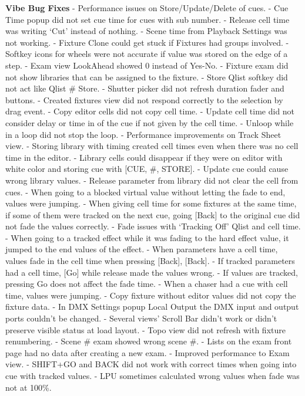 \documentclass[
]{article}
\begin{document}
\textbf{Vibe Bug Fixes}
- Performance issues on Store/Update/Delete of cues.
- Cue Time popup did not set cue time for cues with sub number.
- Release cell time was writing `Cut' instead of nothing.
- Scene time from Playback Settings was not working.
- Fixture Clone could get stuck if Fixtures had groups involved.
- Softkey icons for wheels were not accurate if value was stored on the edge of a step.
- Exam view LookAhead showed 0 instead of Yes-No.
- Fixture exam did not show libraries that can be assigned to the fixture.
- Store Qlist softkey did not act like Qlist \# Store.
- Shutter picker did not refresh duration fader and buttons.
- Created fixtures view did not respond correctly to the selection by drag event.
- Copy editor cells did not copy cell time.
- Update cell time did not consider delay or time in of the cue if not given by the cell time.
- Unloop while in a loop did not stop the loop.
- Performance improvements on Track Sheet view.
- Storing library with timing created cell times even when there was no cell time in the editor.
- Library cells could disappear if they were on editor with white color and storing cue with {[}CUE, \#, STORE{]}.
- Update cue could cause wrong library values.
- Release parameter from library did not clear the cell from cues.
- When going to a blocked virtual value without letting the fade to end, values were jumping.
- When giving cell time for some fixtures at the same time, if some of them were tracked on the next cue, going {[}Back{]} to the original cue did not fade the values correctly.
- Fade issues with `Tracking Off' Qlist and cell time.
- When going to a tracked effect while it was fading to the hard effect value, it jumped to the end values of the effect.
- When parameters have a cell time, values fade in the cell time when pressing {[}Back{]}, {[}Back{]}.
- If tracked parameters had a cell time, {[}Go{]} while release made the values wrong.
- If values are tracked, pressing Go does not affect the fade time.
- When a chaser had a cue with cell time, values were jumping.
- Copy fixture without editor values did not copy the fixture data.
- In DMX Settings popup Local Output the DMX input and output ports couldn't be changed.
- Several views' Scroll Bar didn't work or didn't preserve visible status at load layout.
- Topo view did not refresh with fixture renumbering.
- Scene \# exam showed wrong scene \#.
- Lists on the exam front page had no data after creating a new exam.
- Improved performance to Exam view.
- SHIFT+GO and BACK did not work with correct times when going into cue with tracked values.
- LPU sometimes calculated wrong values when fade was not at 100\%.
\end{document}
